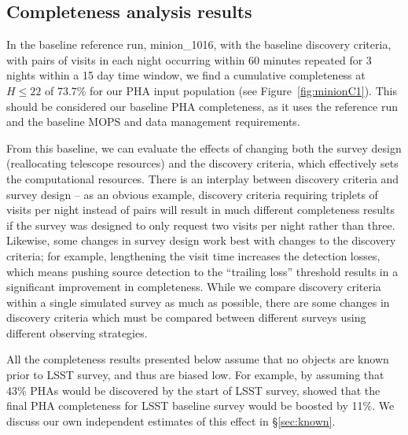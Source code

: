 \subsection{Completeness analysis results}

In the baseline reference run, minion\_1016, with the baseline discovery
criteria, with pairs of visits in each night occurring within 60 minutes
repeated for 3 nights within a 15 day time window, we find a cumulative
completeness at $H\le22$ of 73.7\% for our PHA input population (see
Figure~\ref{fig:minionC1}). This should be considered our baseline PHA
completeness, as it uses the reference run and the baseline MOPS and data
management requirements.

From this baseline, we can evaluate the effects of changing both the survey design (reallocating telescope resources) and the discovery criteria, which effectively sets the computational resources.
There is an interplay between discovery criteria and survey design -- as an obvious example, discovery criteria requiring triplets of visits per night instead of pairs will result in much different completeness results if the survey was designed to only request two visits per night rather than three. Likewise, some changes in survey design work best with changes to the discovery criteria; for example, lengthening the visit time increases the detection losses, which means pushing source detection to the ``trailing loss'' threshold results in a significant improvement in completeness. While we compare discovery criteria within a single simulated survey as much as possible, there are some changes in discovery criteria which must be compared between different surveys using different observing strategies.

All the completeness results presented below assume that no objects are known prior to LSST survey,
and thus are biased low. For example, by assuming that 43\% PHAs would be discovered by the start of
LSST survey, \cite{GMS2016} showed that the final PHA completeness for LSST baseline survey would
be boosted by 11\%. We discuss our own independent estimates of this effect in \S\ref{sec:known}.

